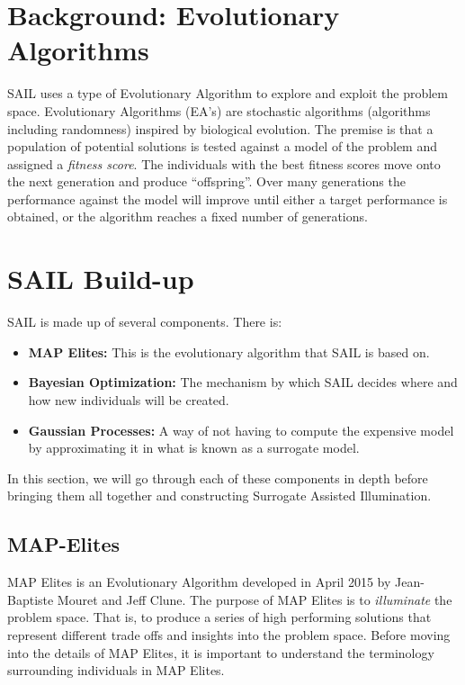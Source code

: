 \documentclass{sig-alternate}
\begin{document}

\section{Background: Evolutionary Algorithms}
\label{sec:evolutionaryAlgorithms}

SAIL uses a type of Evolutionary Algorithm to explore and exploit the problem space.
Evolutionary Algorithms (EA's) are stochastic algorithms (algorithms including randomness) inspired by biological evolution.
The premise is that a population of potential solutions is tested against a model of the problem and assigned a \textit{fitness score}.
The individuals with the best fitness scores move onto the next generation and produce ``offspring''.
Over many generations the performance against the model will improve until either a target performance is obtained, or the algorithm reaches a fixed number of generations. 


\section{SAIL Build-up}
\label{sec:SAILBuildUp}
SAIL is made up of several components. There is:
\begin{itemize}
  \item \textbf{MAP Elites:} This is the evolutionary algorithm that SAIL is based on.
  \item \textbf{Bayesian Optimization:} The mechanism by which SAIL decides where and how new individuals will be created.
  \item \textbf{Gaussian Processes:} A way of not having to compute the expensive model by approximating it in what is known as a surrogate model.
\end{itemize}
In this section, we will go through each of these components in depth before bringing them all together and constructing Surrogate Assisted Illumination.

\subsection{MAP-Elites}
\label{sec:MAP-Elites}

MAP Elites is an Evolutionary Algorithm developed in April 2015 by Jean-Baptiste Mouret and Jeff Clune.
The purpose of MAP Elites is to \textit{illuminate} the problem space.
That is, to produce a series of high performing solutions that represent different trade offs and insights into the problem space.
Before moving into the details of MAP Elites, it is important to understand the terminology surrounding individuals in MAP Elites.
\end{document}
